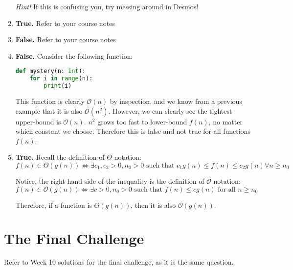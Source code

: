 \documentclass{article}
\begin{document}
\begin{enumerate}
\textit{Hint!} If this is confusing you, try messing around in Desmos! 

\item \textbf{True.} Refer to your course notes
\item \textbf{False.} Refer to your course notes
\item \textbf{False.} Consider the following function:
\begin{lstlisting}[language=Python, style=mystyle]
def mystery(n: int):
    for i in range(n):
        print(i)
\end{lstlisting}

This function is clearly $\mathcal{O}(n)$ by inspection, and we know from a previous example that it is also $\mathcal{O}(n^2)$. However, we can clearly see the tightest upper-bound is $\mathcal{O}(n)$. $n^2$ grows too fast to lower-bound $f(n)$, no matter which constant we choose. Therefore this is false and not true for all functions $f(n)$.

\item \textbf{True.}
Recall the definition of $\Theta$ notation:
\begin{equation}
    f(n) \in \Theta(g(n)) \iff \exists c_1, c_2 > 0, n_0 > 0 \text{ such that } c_1g(n) \leq f(n) \leq c_2g(n) \forall n \geq n_0
\end{equation}

Notice, the right-hand side of the inequality is the definition of $\mathcal{O}$ notation:
\begin{equation}
    f(n) \in \mathcal{O}(g(n)) \iff \exists c > 0, n_0 > 0 \text{ such that } f(n) \leq cg(n) \text{ for all } n \geq n_0
\end{equation}

Therefore, if a function is $\Theta(g(n))$, then it is also $\mathcal{O}(g(n))$.

\end{enumerate}

\section{The Final Challenge}

Refer to Week 10 solutions for the final challenge, as it is the same question.
\end{document}
